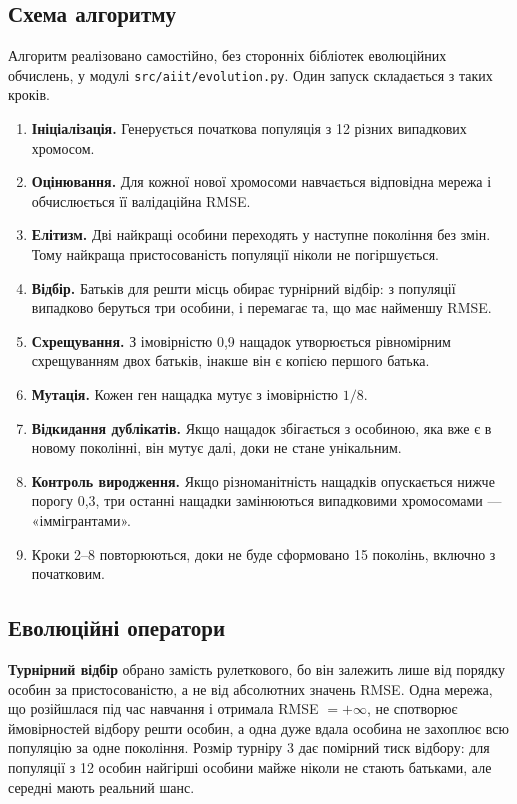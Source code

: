 \documentclass[14pt,a4paper]{extreport}
\begin{document}
\subsection{Схема алгоритму}

Алгоритм реалізовано самостійно, без сторонніх бібліотек еволюційних обчислень, у модулі \texttt{src/aiit/evolution.py}. Один запуск складається з таких кроків.

\begin{enumerate}
\item \textbf{Ініціалізація.} Генерується початкова популяція з 12 різних випадкових хромосом.
\item \textbf{Оцінювання.} Для кожної нової хромосоми навчається відповідна мережа і обчислюється її валідаційна RMSE.
\item \textbf{Елітизм.} Дві найкращі особини переходять у наступне покоління без змін. Тому найкраща пристосованість популяції ніколи не погіршується.
\item \textbf{Відбір.} Батьків для решти місць обирає турнірний відбір: з популяції випадково беруться три особини, і перемагає та, що має найменшу RMSE.
\item \textbf{Схрещування.} З імовірністю 0,9 нащадок утворюється рівномірним схрещуванням двох батьків, інакше він є копією першого батька.
\item \textbf{Мутація.} Кожен ген нащадка мутує з імовірністю $1/8$.
\item \textbf{Відкидання дублікатів.} Якщо нащадок збігається з особиною, яка вже є в новому поколінні, він мутує далі, доки не стане унікальним.
\item \textbf{Контроль виродження.} Якщо різноманітність нащадків опускається нижче порогу 0,3, три останні нащадки замінюються випадковими хромосомами --- «іммігрантами».
\item Кроки 2--8 повторюються, доки не буде сформовано 15 поколінь, включно з початковим.
\end{enumerate}

\subsection{Еволюційні оператори}

\textbf{Турнірний відбір} обрано замість рулеткового, бо він залежить лише від порядку особин за пристосованістю, а не від абсолютних значень RMSE. Одна мережа, що розійшлася під час навчання і отримала RMSE $= +\infty$, не спотворює ймовірностей відбору решти особин, а одна дуже вдала особина не захоплює всю популяцію за одне покоління. Розмір турніру 3 дає помірний тиск відбору: для популяції з 12 особин найгірші особини майже ніколи не стають батьками, але середні мають реальний шанс.
\end{document}
